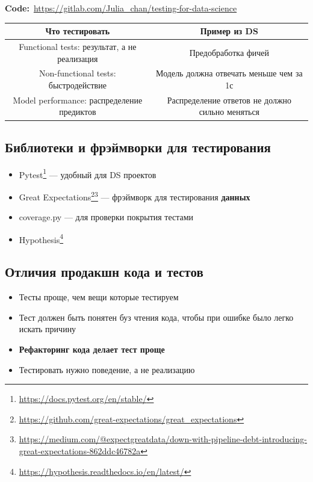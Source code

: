 \textbf{Code:}~\url{https://gitlab.com/Julia_chan/testing-for-data-science} \\

\begin{center}
\begin{tabular}{ c | c } 
    \textbf{Что тестировать} & \textbf{Пример из DS} \\
    \hline
    Functional tests: результат, а не реализация & Предобработка фичей  \\ 
    Non-functional tests: быстродействие & Модель должна отвечать меньше чем за 1с  \\ 
    Model performance: распределение предиктов & Распределение ответов не должно сильно меняться  \\ 
\end{tabular}
\end{center}

\subsection{Библиотеки и фрэймворки для тестирования}

\begin{itemize}
    \item Pytest\footnote{\url{https://docs.pytest.org/en/stable/}} --- удобный для DS проектов
    \item Great Expectations\footnote{\url{https://github.com/great-expectations/great_expectations}}\footnote{\url{https://medium.com/@expectgreatdata/down-with-pipeline-debt-introducing-great-expectations-862ddc46782a}} --- фрэймворк для тестирования \textbf{данных}
    \item coverage.py --- для проверки покрытия тестами
    \item Hypothesis\footnote{\url{https://hypothesis.readthedocs.io/en/latest/}}
\end{itemize}

\subsection{Отличия продакшн кода и тестов}

\begin{itemize}
    \item Тесты проще, чем вещи которые тестируем
    \item Тест должен быть понятен буз чтения кода, чтобы при ошибке было легко искать причину
    \item \textbf{Рефакторинг кода делает тест проще}
    \item Тестировать нужно поведение, а не реализацию
\end{itemize}

